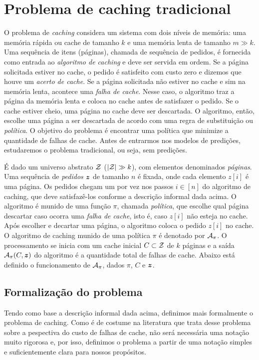 \chapter{Problema de caching tradicional}

O problema de \emph{caching} considera um sistema com dois níveis de memória: uma memória rápida ou cache de tamanho \(k\) e uma memória lenta de tamanho \(m \gg k\). Uma sequência de itens (páginas), chamada de sequência de pedidos, é fornecida como entrada ao \emph{algoritmo de caching} e deve ser servida em ordem. Se a página solicitada estiver no cache, o pedido é satisfeito com custo zero e dizemos que houve um \emph{acerto de cache}. Se a página solicitada não estiver no cache e sim na memória lenta, acontece uma \emph{falha de cache}. Nesse caso, o algoritmo traz a página da memória lenta e coloca no cache antes de satisfazer o pedido. Se o cache estiver cheio, uma página no cache deve ser descartada. O algoritmo, então, escolhe uma página a ser descartada de acordo com uma regra de substituição ou \emph{política}. O objetivo do problema é encontrar uma política que minimize a quantidade de falhas de cache. Antes de entrarmos nos modelos de predições, estudaremos o problema tradicional, ou seja, sem predições.


É dado um universo abstrato \(\mathcal{Z}\) (\(|\mathcal{Z}| \gg k\)), com elementos denominados \emph{páginas}. Uma sequência de \emph{pedidos} \(\bm{z}\) de tamanho \(n\) é fixada, onde cada elemento \(z[i]\) é uma página. Os pedidos chegam um por vez nos passos \(i \in [n]\) do algoritmo de caching, que deve satisfazê-los conforme a descrição informal dada acima. O algoritmo é munido de uma função \(\pi\), chamada \emph{política}, que escolhe qual página descartar caso ocorra uma \emph{falha de cache}, isto é, caso \(z[i]\) não esteja no cache. Após escolher e decartar uma página, o algoritmo coloca o pedido \(z[i]\) no cache. O algoritmo de caching munido de uma política \(\pi\) é denotado por \(\mathcal{A}_\pi\). O processamento se inicia com um cache inicial \(C \subset \mathcal{Z}\) de \(k\) páginas e a saída \(\mathcal{A}_\pi(C,\bm{z})\) do algoritmo é a quantidade total de falhas de cache. Abaixo está definido o funcionamento de \(\mathcal{A}_\pi\), dados \(\pi\), \(C\) e \(\bm{z}\).

\section{Formalização do problema}
Tendo como base a descrição informal dada acima, definimos mais formalmente o problema de caching. Como é de costume na literatura que trata desse problema sobre a pespectiva do custo de falhas de cache, não será necessária uma notação muito rigorosa e, por isso, definimos o problema a partir de uma notação simples e suficientemente clara para nossos propósitos.

